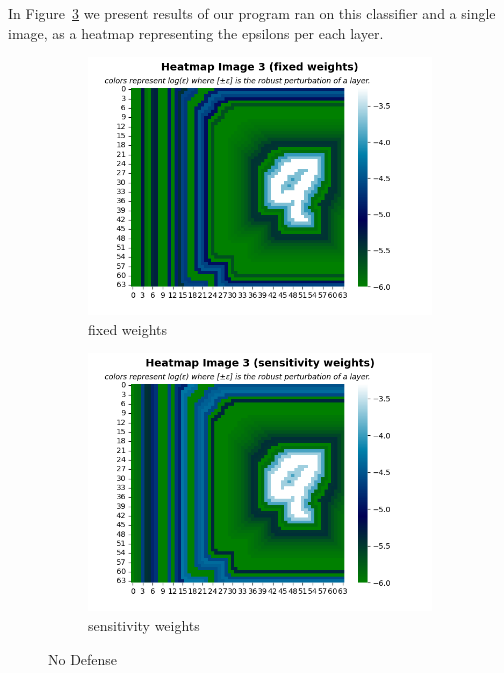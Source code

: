   In Figure~\ref{fig:No defense} we present results of our program ran on this classifier and a single image, as a heatmap representing the epsilons per each layer.
    \begin{figure}
         \centering
         \begin{subfigure}[b]{0.4\textwidth}
             \centering
             \includegraphics[width=\textwidth]{no_defense_fixed_weights.png}
             \caption{fixed weights}
             \label{sub-fig:No defense FW}
         \end{subfigure}
         \hfill
         \begin{subfigure}[b]{0.4\textwidth}
             \centering
             \includegraphics[width=\textwidth]{no_defense_sensitivity_weights.png}
             \caption{sensitivity weights}
             \label{sub-fig:No defense SW}
         \end{subfigure}
         \caption{No Defense}
         \label{fig:No defense}
     \end{figure}
